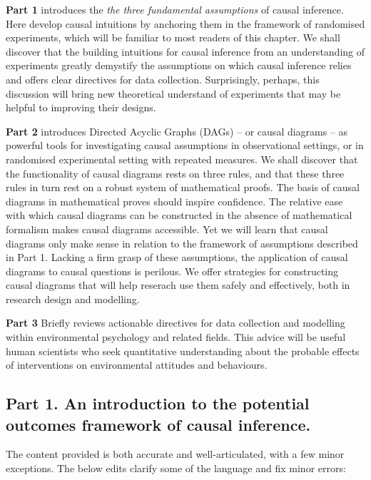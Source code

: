 \documentclass[
  singlecolumn]{article}
\begin{document}
\textbf{Part 1} introduces the \emph{the three fundamental assumptions}
of causal inference. Here develop causal intuitions by anchoring them in
the framework of randomised experiments, which will be familiar to most
readers of this chapter. We shall discover that the building intuitions
for causal inference from an understanding of experiments greatly
demystify the assumptions on which causal inference relies and offers
clear directives for data collection. Surprisingly, perhaps, this
discussion will bring new theoretical understand of experiments that may
be helpful to improving their designs.

\textbf{Part 2} introduces Directed Acyclic Graphs (DAGs) -- or causal
diagrams -- as powerful tools for investigating causal assumptions in
observational settings, or in randomised experimental setting with
repeated measures. We shall discover that the functionality of causal
diagrams rests on three rules, and that these three rules in turn rest
on a robust system of mathematical proofs. The basis of causal diagrams
in mathematical proves should inspire confidence. The relative ease with
which causal diagrams can be constructed in the absence of mathematical
formalism makes causal diagrams accessible. Yet we will learn that
causal diagrams only make sense in relation to the framework of
assumptions described in Part 1. Lacking a firm grasp of these
assumptions, the application of causal diagrams to causal questions is
perilous. We offer strategies for constructing causal diagrams that will
help reserach use them safely and effectively, both in research design
and modelling.

\textbf{Part 3} Briefly reviews actionable directives for data
collection and modelling within environmental psychology and related
fields. This advice will be useful human scientists who seek
quantitative understanding about the probable effects of interventions
on environmental attitudes and behaviours.

\subsection{Part 1. An introduction to the potential outcomes framework
of causal
inference.}\label{part-1.-an-introduction-to-the-potential-outcomes-framework-of-causal-inference.}

The content provided is both accurate and well-articulated, with a few
minor exceptions. The below edits clarify some of the language and fix
minor errors:
\end{document}

